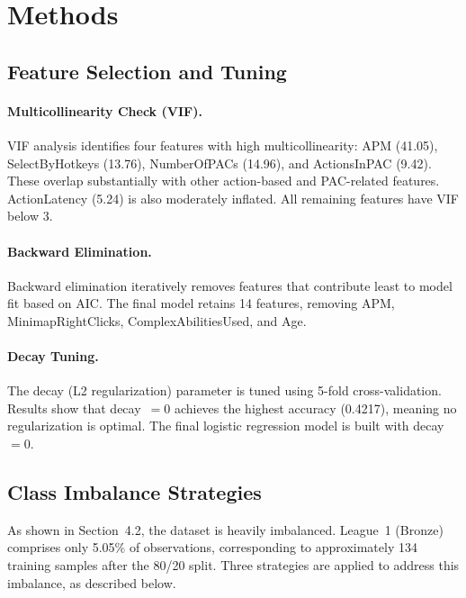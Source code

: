 \documentclass[12pt, a4paper]{article}
\begin{document}
\section{Methods}

\subsection{Feature Selection and Tuning}

\paragraph{Multicollinearity Check (VIF).}
VIF analysis identifies four features with high multicollinearity: APM (41.05),
SelectByHotkeys (13.76), NumberOfPACs (14.96), and ActionsInPAC (9.42). These
overlap substantially with other action-based and PAC-related features. ActionLatency
(5.24) is also moderately inflated. All remaining features have VIF below 3.

\paragraph{Backward Elimination.}
Backward elimination iteratively removes features that contribute least to model fit based
on AIC. The final model retains 14 features, removing APM, MinimapRightClicks,
ComplexAbilitiesUsed, and Age.

\paragraph{Decay Tuning.}
The decay (L2 regularization) parameter is tuned using 5-fold cross-validation. Results
show that decay~$= 0$ achieves the highest accuracy (0.4217), meaning no regularization
is optimal. The final logistic regression model is built with decay~$= 0$.

\subsection{Class Imbalance Strategies}

As shown in Section~4.2, the dataset is heavily imbalanced. League~1 (Bronze) comprises
only 5.05\% of observations, corresponding to approximately 134 training samples after the
80/20 split. Three strategies are applied to address this imbalance, as described below.
\end{document}
